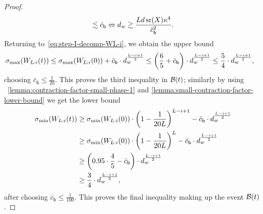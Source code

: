 \begin{proof}
\[    \lesssim \bar{c}_{\mathsf{b}} \Leftrightarrow
    d_{w} \gtrsim \frac{L d \operatorname{\mathrm{sr}}(X) \kappa^4}{\bar{c}_{\mathsf{b}}^2}.
  \]
  Returning to~\eqref{eq:step-I-decomp-WL-i}, we obtain the upper bound
  \begin{align*}
      \sigma_{\max}(W_{L:i}(t))
      &\leq \sigma_{\max}(W_{L:i}(0)) +
      \bar{c}_{\mathsf{b}} \cdot d_{w}^{\frac{L - i + 1}{2}} \leq \left( \frac{6}{5} + \bar{c}_{\mathsf{b}} \right) \cdot d_{w}^{\frac{L - i + 1}{2}} \leq \frac{5}{4} \cdot d_{w}^{\frac{L - i + 1}{2}},
  \end{align*}
  choosing $\bar{c}_{\mathsf{b}} \leq \frac{1}{20}$. This proves the third inequality
  in $\mathcal{B}(t)$; similarly by using ~\cref{lemma:contraction-factor-small-phase-1} and \cref{lemma:small-contraction-factor-lower-bound} we get the lower bound
  \begin{align*}
     \sigma_{\min}(W_{L:i}(t)) &\geq 
     \sigma_{\min}(W_{L:i}(0)) \cdot \left(1 - \frac{1}{20 L}\right)^{L - i + 1}
     - \bar{c}_{\mathsf{b}} \cdot d_{w}^{\frac{L - i + 1}{2}} \\
     & \geq
    \sigma_{\min}(W_{L:i}(0)) \cdot \left(1 - \frac{1}{20 L}\right)^{L}
     - \bar{c}_{\mathsf{b}} \cdot d_{w}^{\frac{L - i + 1}{2}} \\
     &\geq
     \left(0.95 \cdot \frac{4}{5} - \bar{c}_{\mathsf{b}}\right) \cdot d_{w}^{\frac{L - i + 1}{2}} \\
     &\geq \frac{3}{4} \cdot d_{w}^{\frac{L - i + 1}{2}},
  \end{align*}
  after choosing $\bar{c}_{\mathsf{b}} \leq \frac{1}{100}$. This proves the final inequality
  making up the event $\mathcal{B}(t)$.
\end{proof}




